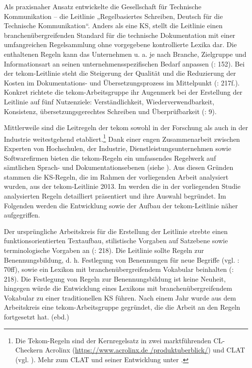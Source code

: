 Als praxisnaher Ansatz entwickelte die Gesellschaft für Technische Kommunikation -- \citet{tekom2013} die Leitlinie „Regelbasiertes Schreiben, Deutsch für die Technische Kommunikation“. Anders als eine KS, stellt die Leitlinie einen branchenübergreifenden Standard für die technische Dokumentation mit einer umfangreichen Regelsammlung ohne vorgegebene kontrollierte Lexika dar. Die enthaltenen Regeln kann das Unternehmen u. a. je nach Branche, Zielgruppe und Informationsart an seinen unternehmensspezifischen Bedarf anpassen (\citealt{BaumertVerhein-Jarren2012}: 152). Bei der tekom-Leitlinie steht die Steigerung der Qualität und die Reduzierung der Kosten im Dokumentations- und Übersetzungsprozess im Mittelpunkt (\citealt{DrewerZiegler2014}: 217f.). Konkret richtete die tekom-Arbeitsgruppe ihr Augenmerk bei der Erstellung der Leitlinie auf fünf Nutzenziele: Verständlichkeit, Wiederverwendbarkeit, Konsistenz, übersetzungsgerechtes Schreiben und Überprüfbarkeit (\citealt{tekom2013}: 9).

Mittlerweile sind die Leitregeln der tekom sowohl in der Forschung als auch in der Industrie weitestgehend etabliert.\footnote{Die Tekom-Regeln sind der Kernregelsatz in zwei marktführenden CL-Checkern Acrolinx (\url{https://www.acrolinx.de /produktuberblick/}) und CLAT (vgl. \citealt{Geldbach2009}). Mehr zum CLAT und seiner Entwicklung unter .} Dank einer engen Zusammenarbeit zwischen Experten von Hochschulen, der Industrie, Dienstleistungsunternehmen sowie Softwarefirmen bieten die tekom-Regeln ein umfassendes Regelwerk auf sämtlichen Sprach- und Dokumentationsebenen (siehe  ). Aus diesen Gründen stammen die KS-Regeln, die im Rahmen der vorliegenden Arbeit analysiert wurden, aus der tekom-Leitlinie 2013. Im  werden die in der vorliegenden Studie analysierten Regeln detailliert präsentiert und ihre Auswahl begründet. Im Folgenden werden die Entwicklung sowie der Aufbau der tekom-Leitlinie näher aufgegriffen.

Der ursprüngliche Arbeitskreis für die Erstellung der Leitlinie strebte einen funktionsorientierten Textaufbau, stilistische Vorgaben auf Satzebene sowie terminologische Vorgaben an (\citealt{DrewerZiegler2014}: 218). Die Leitlinie sollte Regeln zur Benennungsbildung, d. h. Festlegung von Benennungen für neue Begriffe (vgl. \citealt{DrewerSchmitz2017}: 70ff), sowie ein Lexikon mit branchenübergreifendem Vokabular beinhalten (\citealt{DrewerZiegler2014}: 218). Die Festlegung von Regeln zur Benennungsbildung ist keine Neuheit, hingegen würde die Entwicklung eines Lexikons mit branchenübergreifendem Vokabular zu einer traditionellen KS führen. Nach einem Jahr wurde aus dem Arbeitskreis eine tekom-Arbeitsgruppe gegründet, die die Arbeit an den Regeln fortgesetzt hat. (ebd.)

